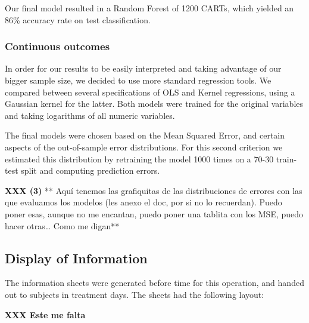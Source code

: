 \documentclass[]{article}
\begin{document}
Our final model resulted in a Random Forest of 1200 CARTs, which yielded
an 86\% accuracy rate on test classification.

\subsubsection{Continuous outcomes}\label{continuous-outcomes-1}

In order for our results to be easily interpreted and taking advantage
of our bigger sample size, we decided to use more standard regression
tools. We compared between several specifications of OLS and Kernel
regressions, using a Gaussian kernel for the latter. Both models were
trained for the original variables and taking logarithms of all numeric
variables.

The final models were chosen based on the Mean Squared Error, and
certain aspects of the out-of-sample error distributions. For this
second criterion we estimated this distribution by retraining the model
1000 times on a 70-30 train-test split and computing prediction errors.

\textbf{XXX (3)} ** Aquí tenemos las grafiquitas de las distribuciones
de errores con las que evaluamos los modelos (les anexo el doc, por si
no lo recuerdan). Puedo poner esas, aunque no me encantan, puedo poner
una tablita con los MSE, puedo hacer otras\ldots{} Como me digan**

\subsection{Display of Information}\label{display-of-information-1}

The information sheets were generated before time for this operation,
and handed out to subjects in treatment days. The sheets had the
following layout:

\textbf{XXX Este me falta}
\end{document}

